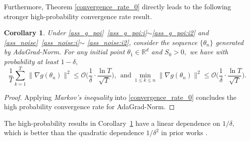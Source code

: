 \documentclass[standalone]{article}
\newtheorem{cor}[thm]{Corollary}
\begin{document}
Furthermore, Theorem \ref{convergence_rate_0} directly leads to the following stronger high-probability convergence rate result.

\begin{cor}\label{coro:rate}
Under \cref{ass_g_poi}~\ref{ass_g_poi:i}$\sim$\ref{ass_g_poi:i2} and  \cref{ass_noise}~\ref{ass_noise:i}$\sim$ \ref{ass_noise:i2}, consider the sequence $\{\theta_{n}\}$ generated by AdaGrad-Norm. For any initial point $\theta_{1}\in \mathbb{R}^{d}$ and $S_{0}>0,$ we have with probability at least $1-\delta,$
$$\frac{1}{T}\sum_{k=1}^{T}{\big\|\nabla g(\theta_{n})\big\|^{2}} \leq \mathcal{O}\bigg(\frac{1}{\delta}\cdot\frac{\ln T}{\sqrt{T}}\bigg),\ \ \text{and}\ \min_{1\le k\le n}\|\nabla g(\theta_{n})\|^{2} \leq \mathcal{O}\bigg(\frac{1}{\delta}\cdot\frac{\ln T}{\sqrt{T}}\bigg).$$ 
\end{cor}
\begin{proof}%
Applying \emph{Markov's inequality} into \cref{convergence_rate_0} concludes the high probability convergence rate for AdaGrad-Norm. 
\end{proof}
The high-probability results in Corollary~\ref{coro:rate} have a linear dependence on $1/\delta,$ which is better than the quadratic dependence $1/\delta^{2}$ in prior works \citep{faw2022power,wang2023convergence}.


\end{document}
